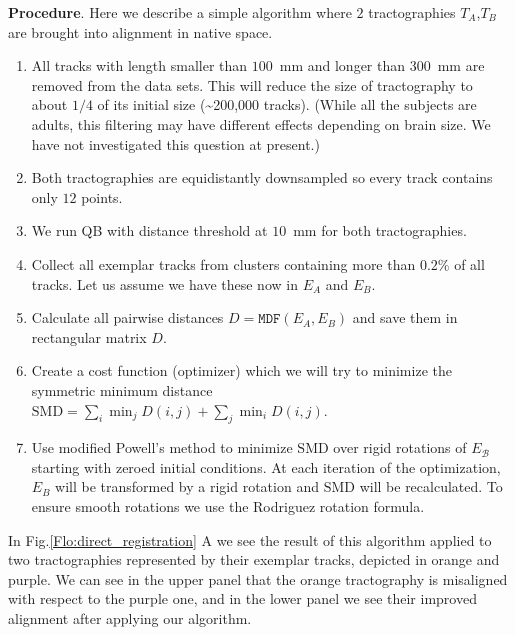 \documentclass[preprint,authoryear,a4paper,10pt,onecolumn]{elsarticle}
\begin{document}
\textbf{Procedure}. Here we describe a simple algorithm where $2$
tractographies $T_{A}$,$T_{B}$ are brought into alignment in native
space.
\begin{enumerate}
\item All tracks with length smaller than $100$~mm and longer than $300$~mm
are removed from the data sets. This will reduce the size of tractography
to about $1/4$ of its initial size (\textasciitilde200,000 tracks). (While all
the subjects are adults, this filtering may have different effects
depending on brain size. We have not investigated this question at
present.)
\item Both tractographies are equidistantly downsampled so every track contains
only $12$ points. 
\item We run QB with distance threshold at $10$~mm for both tractographies.
\item Collect all exemplar tracks from clusters containing more than $0.2\%$
of all tracks. Let us assume we have these now in $E_{A}$ and $E_{B}$.
\item Calculate all pairwise distances $D=\mathtt{MDF}(E_{A},E_{B})$ and
save them in rectangular matrix $D$. 
\item Create a cost function (optimizer) which we will try to minimize the
symmetric minimum distance $\mathrm{SMD}=\sum_{i}\min_{j}D(i,j)+\sum_{j}\min_{i}D(i,j).$
\item Use modified Powell's method \citep{fletcher1987practical} to minimize
$\mathrm{SMD}$ over rigid rotations of $E_{\mathcal{B}}$ starting
with zeroed initial conditions. At each iteration of the optimization,
$E_{B}$ will be transformed by a rigid rotation and $\mathrm{SMD}$
will be recalculated. To ensure smooth rotations we use the Rodriguez
rotation formula.
\end{enumerate}

In Fig.\ref{Flo:direct_registration} A we see the result of this
algorithm applied to two tractographies represented by their
exemplar tracks, depicted in orange and purple. We can see in the
upper panel that the orange tractography is misaligned with respect to
the purple one, and in the lower panel we see their improved alignment
after applying our algorithm.
\end{document}
